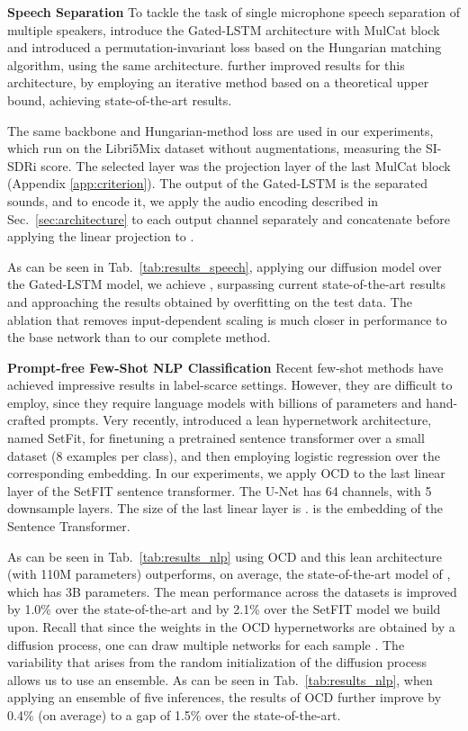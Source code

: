 \documentclass{article}
\theoremstyle{plain}
\begin{document}
{\bf Speech Separation\quad}
To tackle the task of single microphone speech separation of multiple speakers, \citet{VSUNS} introduce the Gated-LSTM architecture with MulCat block and \citet{many_speak} introduced a permutation-invariant loss based on the Hungarian matching algorithm, using the same architecture. \citet{sepit_paper}  further improved results for this architecture, by employing an iterative method based on a theoretical upper bound, achieving state-of-the-art results. 





The same backbone and Hungarian-method loss are used in our experiments, which run on the Libri5Mix dataset without augmentations, measuring the SI-SDRi score. The selected layer was the projection layer of the last MulCat block  (Appendix \ref{app:criterion}). The output of the Gated-LSTM is the separated sounds, and to encode it, we apply the audio encoding described in  Sec.~\ref{sec:architecture} to each output channel separately and concatenate before applying the linear projection to  .

As can be seen in Tab.~\ref{tab:results_speech}, applying our diffusion model over the Gated-LSTM model, we achieve , surpassing current state-of-the-art results and approaching the results obtained by overfitting on the test data. The ablation that removes input-dependent scaling is much closer in performance to the base network than to our complete method.

{\bf Prompt-free Few-Shot NLP Classification\quad}
Recent few-shot methods have achieved impressive results in label-scarce settings. However, they are difficult to employ, since they require language models with billions of parameters and hand-crafted prompts. Very recently, \citet{tunstall2022efficient} introduced a lean hypernetwork architecture, named SetFit, for finetuning a pretrained sentence transformer over a small dataset (8 examples per class), and then employing logistic regression over the corresponding embedding. In our experiments, we apply OCD to the last linear layer of the SetFIT sentence transformer. The U-Net has 64 channels, with 5 downsample layers. The size of the last linear layer is .  is the embedding of the Sentence Transformer.

As can be seen in Tab.~\ref{tab:results_nlp} using OCD and this lean architecture (with 110M parameters) outperforms, on average, the state-of-the-art model of \citet{liu2022few}, which has 3B parameters. The mean performance across the datasets is improved by 1.0\%  over the state-of-the-art and by 2.1\% over the SetFIT model we build upon. Recall that since the weights in the OCD hypernetworks are obtained by a diffusion process, one can draw multiple networks for each sample . The variability that arises from the random initialization of the diffusion process allows us to use an ensemble. As can be seen in Tab.~\ref{tab:results_nlp}, when applying an ensemble of five inferences, the results of OCD further improve by 0.4\% (on average) to a gap of 1.5\% over the state-of-the-art. 
\end{document}
